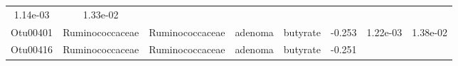 \documentclass[11pt,]{article}
\begin{document}
\begin{longtable}[]{@{}cccccccc@{}}
\begin{minipage}[t]{0.08\columnwidth}
1.14e-03\strut
\end{minipage} & \begin{minipage}[t]{0.08\columnwidth}\centering\strut
1.33e-02\strut
\end{minipage}\tabularnewline
\begin{minipage}[t]{0.08\columnwidth}\centering\strut
Otu00401\strut
\end{minipage} & \begin{minipage}[t]{0.15\columnwidth}\centering\strut
Ruminococcaceae\strut
\end{minipage} & \begin{minipage}[t]{0.15\columnwidth}\centering\strut
Ruminococcaceae\strut
\end{minipage} & \begin{minipage}[t]{0.08\columnwidth}\centering\strut
adenoma\strut
\end{minipage} & \begin{minipage}[t]{0.09\columnwidth}\centering\strut
butyrate\strut
\end{minipage} & \begin{minipage}[t]{0.07\columnwidth}\centering\strut
-0.253\strut
\end{minipage} & \begin{minipage}[t]{0.08\columnwidth}\centering\strut
1.22e-03\strut
\end{minipage} & \begin{minipage}[t]{0.08\columnwidth}\centering\strut
1.38e-02\strut
\end{minipage}\tabularnewline
\begin{minipage}[t]{0.08\columnwidth}\centering\strut
Otu00416\strut
\end{minipage} & \begin{minipage}[t]{0.15\columnwidth}\centering\strut
Ruminococcaceae\strut
\end{minipage} & \begin{minipage}[t]{0.15\columnwidth}\centering\strut
Ruminococcaceae\strut
\end{minipage} & \begin{minipage}[t]{0.08\columnwidth}\centering\strut
adenoma\strut
\end{minipage} & \begin{minipage}[t]{0.09\columnwidth}\centering\strut
butyrate\strut
\end{minipage} & \begin{minipage}[t]{0.07\columnwidth}\centering\strut
-0.251\strut
\end{minipage} & \begin{minipage}[t]{0.08\columnwidth}\centering\strut

\end{minipage}
\end{longtable}
\end{document}
